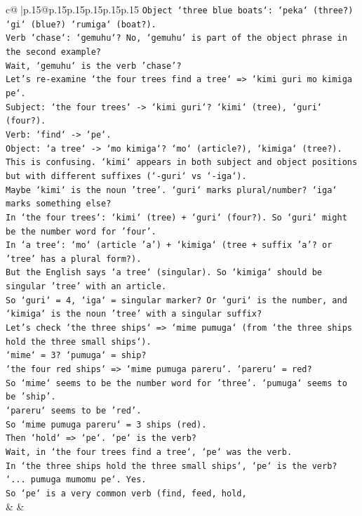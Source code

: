 \documentclass{article}
\begin{document}
{\begin{supertabular}{c@{$\;$}|p{.15\linewidth}@{}p{.15\linewidth}p{.15\linewidth}p{.15\linewidth}p{.15\linewidth}p{.15\linewidth}}
{{{\texttt{Object `three blue boats`: `peka` (three?) `gi` (blue?) `rumiga` (boat?).} \\
\texttt{Verb `chase`: `gemuhu`? No, `gemuhu` is part of the object phrase in the second example?} \\
\texttt{Wait, `gemuhu` is the verb 'chase'?} \\
\texttt{Let's re{-}examine `the four trees find a tree` => `kimi guri mo kimiga pe`.} \\
\texttt{Subject: `the four trees` {-}> `kimi guri`? `kimi` (tree), `guri` (four?).} \\
\texttt{Verb: `find` {-}> `pe`.} \\
\texttt{Object: `a tree` {-}> `mo kimiga`? `mo` (article?), `kimiga` (tree?).} \\
\texttt{This is confusing. `kimi` appears in both subject and object positions but with different suffixes (`{-}guri` vs `{-}iga`).} \\
\texttt{Maybe `kimi` is the noun 'tree'. `guri` marks plural/number? `iga` marks something else?} \\
\texttt{In `the four trees`: `kimi` (tree) + `guri` (four?). So `guri` might be the number word for 'four'.} \\
\texttt{In `a tree`: `mo` (article 'a') + `kimiga` (tree + suffix 'a'? or 'tree' has a plural form?).} \\
\texttt{But the English says `a tree` (singular). So `kimiga` should be singular 'tree' with an article.} \\
\texttt{So `guri` = 4, `iga` = singular marker? Or `guri` is the number, and `kimiga` is the noun 'tree' with a singular suffix?} \\
\texttt{Let's check `the three ships` => `mime pumuga` (from `the three ships hold the three small ships`).} \\
\texttt{`mime` = 3? `pumuga` = ship?} \\
\texttt{`the four red ships` => `mime pumuga pareru`. `pareru` = red?} \\
\texttt{So `mime` seems to be the number word for 'three'. `pumuga` seems to be 'ship'.} \\
\texttt{`pareru` seems to be 'red'.} \\
\texttt{So `mime pumuga pareru` = 3 ships (red).} \\
\texttt{Then `hold` => `pe`. `pe` is the verb?} \\
\texttt{Wait, in `the four trees find a tree`, `pe` was the verb.} \\
\texttt{In `the three ships hold the three small ships`, `pe` is the verb? `... pumuga mumomu pe`. Yes.} \\
\texttt{So `pe` is a very common verb (find, feed, hold,} \\
            }
        }
    }
    & & \\ \\


\end{supertabular}}
\end{document}
